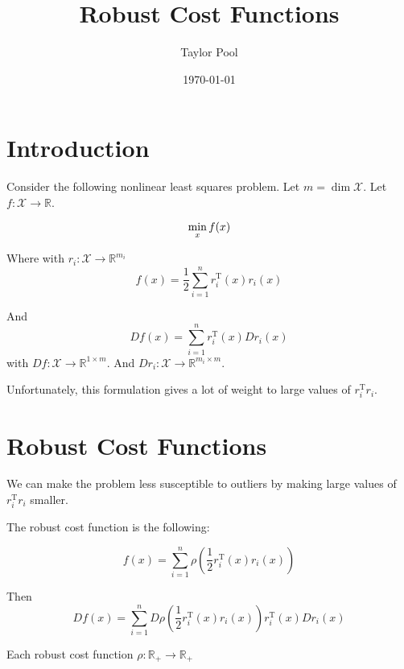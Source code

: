 \documentclass{article}
\title{Robust Cost Functions}
\author{Taylor Pool}
\date{\today}
\newcommand{\T}{\mathrm{T}}
\begin{document}
\maketitle

\section{Introduction}

Consider the following nonlinear least squares problem.
Let $m = \dim{\mathcal{X}}$.
Let $f: \mathcal{X} \rightarrow \mathbb{R}$.

\begin{equation}
	\min_x f(x) \\
\end{equation}

Where with $r_i: \mathcal{X} \rightarrow \mathbb{R}^{m_i}$
\begin{equation}
	f(x) = \frac{1}{2} \sum_{i=1}^n r_i^\T \left( x \right) r_i \left( x \right)
\end{equation}

And
\begin{equation}
	Df(x) = \sum_{i=1}^n r_i^\T \left( x \right) Dr_i \left( x  \right)
\end{equation}
with $Df: \mathcal{X} \rightarrow \mathbb{R}^{1 \times m}$.
And $Dr_i: \mathcal{X} \rightarrow \mathbb{R}^{m_i \times m}$.

Unfortunately, this formulation gives a lot of weight to large values of $r_i^\T r_i$.

\section{Robust Cost Functions}

We can make the problem less susceptible to outliers by making large values of $r_i^\T r_i$ smaller.

The robust cost function is the following:

\begin{equation}
	f(x) = \sum_{i=1}^n \rho\left( \frac{1}{2} r_i^\T \left( x \right) r_i \left( x \right) \right)
\end{equation}

Then
\begin{equation}
	Df(x) = \sum_{i=1}^n D\rho\left( \frac{1}{2} r_i^\T \left( x \right) r_i \left( x \right) \right) r_i^\T \left( x \right) Dr_i \left( x \right)
\end{equation}

Each robust cost function $\rho: \mathbb{R}_+ \rightarrow \mathbb{R}_+$
\end{document}
